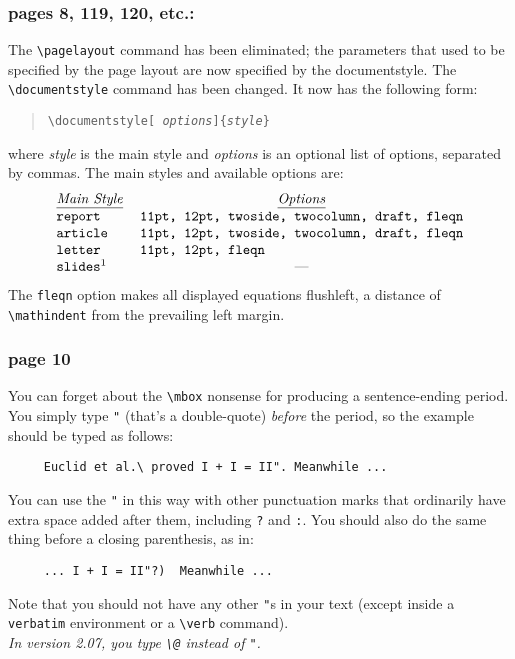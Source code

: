 \subsubsection*
{pages 8, 119, 120, etc.:}
The \hbox{\verb|\pagelayout|} command has been eliminated; the parameters
that used to be specified by the page layout are now specified by
the documentstyle.  The \hbox{\verb|\documentstyle|} command has been
changed.  It now has the following form:
\begin{quote}
\tt \verb|\documentstyle|[{\it 
   options\/}]\hbox{\verb"{"}{\it style\/}\hbox{\verb"}"}
\end{quote}
where {\it style\/} is the main style and {\it options\/} is an
optional list of options, separated by commas.  The main styles 
and available options are:
\[ \begin{tabular}{ll}
    \multicolumn{1}{c}{\underline{{\it Main Style\/}}} & 
      \multicolumn{1}{c}{\underline{{\it Options\/}}}\\
    \tt report & \tt 11pt, 12pt, twoside, twocolumn, draft, fleqn\\
    \tt article & \tt 11pt, 12pt, twoside, twocolumn, draft, fleqn\\
    \tt letter &  \tt 11pt, 12pt, fleqn\\
    \tt slides\footnotemark &   \multicolumn{1}{c}{---}
   \end{tabular}\]
%
The \hbox{\verb"fleqn"} option makes all displayed equations
flushleft, a distance of \linebreak%
\hbox{\verb"\mathindent"} from the prevailing
left margin.

\subsubsection*{page 10}
You can forget about the \hbox{\verb"\mbox"} nonsense for producing
a sentence-ending period.  You simply type \hbox{\verb|"|} (that's
a double-quote) {\it before\/} the period, so the example should
be typed as follows:
\begin{verbatim}
     Euclid et al.\ proved I + I = II". Meanwhile ...
\end{verbatim}
You can use the \hbox{\verb|"|} in this way with other punctuation
marks that ordinarily have extra space added after them, including
\hbox{\verb"?"} and \hbox{\verb":"}.  You should also do the same
thing before a closing parenthesis, as in:
\begin{verbatim}
     ... I + I = II"?)  Meanwhile ...
\end{verbatim}
Note that you should not have any other \hbox{\verb|"|}s in your
text (except inside a \hbox{\verb"verbatim"} environment or
a \hbox{\verb"\verb"} command).\\
{\it In version 2.07, you type \verb|\@| instead of \verb|"|.}

